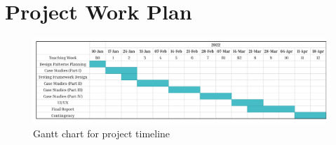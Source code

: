 \chapter{Project Work Plan}

\begin{figure}[h]
	\centering
	\includegraphics[width=1.0\linewidth]{./assets/images/work-plan-gantt.pdf}
	\caption{Gantt chart for project timeline}
	\label{fig:work-plan-gantt}
\end{figure}


